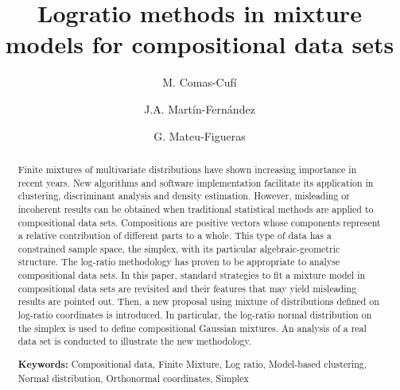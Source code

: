 \documentclass[10pt, a4paper]{article}
\title{Logratio methods in mixture models for compositional data sets}
\author{M. Comas-Cufí \and J.A. Martín-Fernández \and G. Mateu-Figueras}
\begin{document}
\maketitle




\begin{abstract}
Finite mixtures of multivariate distributions have shown increasing importance in recent years. New algorithms and software implementation facilitate its application in clustering, discriminant analysis and density estimation. 
However, misleading or incoherent results can be obtained when traditional statistical methods are applied to compositional data sets.
Compositions are positive vectors whose components represent a relative contribution of different parts to a whole.  This type of data has a
constrained sample space, the simplex, with its particular algebraic-geometric structure. The log-ratio methodology has proven to be appropriate to analyse compositional data sets. In this paper, standard strategies to fit a mixture model in compositional data sets are revisited and their features that may yield misleading results are pointed out. Then, a new proposal using mixture of distributions defined on log-ratio coordinates is introduced. In particular, the log-ratio normal distribution on the simplex is used to define compositional Gaussian mixtures.  An analysis of a real data set is conducted to illustrate the new methodology.

{\bf Keywords:} Compositional data, Finite Mixture, Log ratio, Model-based clustering, Normal distribution, Orthonormal coordinates, Simplex
\end{abstract}



\end{document}
